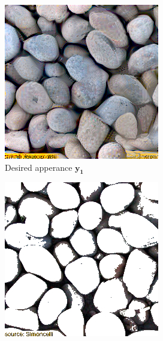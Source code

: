 \begin{figure}[ht]
    \centering    
    \begin{subfigure}{\textwidth}
        \centering
        \begin{subfigure}{0.2\textwidth}
            \centering
            \includegraphics[width=\textwidth]{images/01-pixels_vs_stats-pixels_target.jpg}
            \caption*{Desired apperance \(\bm{y_1}\)}
            \vspace*{5mm}
            \label{fig:intro_pixels_vs_stats-pixels_target}
        \end{subfigure}
        \hfill
        \begin{subfigure}{0.2\textwidth}
            \centering
            \includegraphics[width=\textwidth]{images/01-pixels_vs_stats-bg.jpg}

\end{subfigure}
\end{subfigure}
\end{figure}

